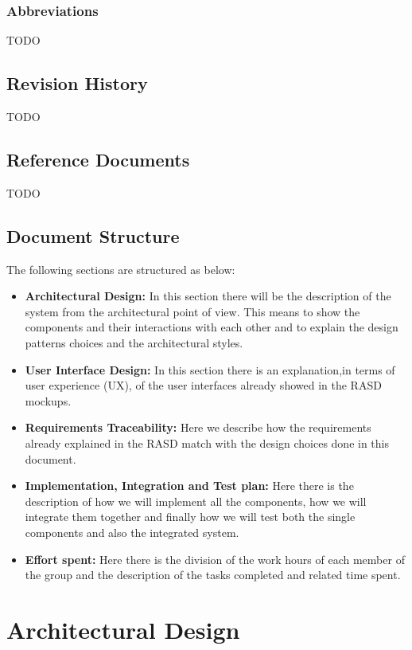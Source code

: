 \documentclass[titlepage]{article}
\begin{document}
\subsubsection{Abbreviations}
TODO
\subsection{Revision History}
TODO
\subsection{Reference Documents}
TODO
\subsection{Document Structure}
The following sections are structured as below:
\begin{itemize}
	\item \textbf{Architectural Design: }In this section there will be the description of the system from the architectural point of view. This means to show the components and their interactions with each other and to explain the design patterns choices and the architectural styles. 
	\item \textbf{User Interface Design:} In this section there is an explanation,in terms of user experience (UX), of the user interfaces already showed in the RASD mockups.
	\item \textbf{Requirements Traceability:} Here we describe how the requirements already explained in the RASD match with the design choices done in this document.
	\item \textbf{Implementation, Integration and Test plan:} Here there is the description of how we will implement all the components, how we will integrate them together and finally how we will test both the single components and also the integrated system.
	\item \textbf{Effort spent:} Here there is the division of the work hours of each member of the group and the description of the tasks completed and related time spent.
\end{itemize}
\section{Architectural Design}
\end{document}
